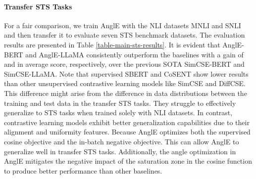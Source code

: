 \documentclass{article} \usepackage{iclr2024_conference,times}
\begin{document}
\paragraph{Transfer STS Tasks} For a fair comparison, we train AnglE with the NLI datasets MNLI \citep{williams-etal-2018-broad} and SNLI \citep{bowman-etal-2015-large} and then transfer it to evaluate seven STS benchmark datasets. The evaluation results are presented in Table \ref{table-main-sts-results}. It is evident that AnglE-BERT and AnglE-LLaMA consistently outperform the baselines with a gain of  and  in average score, respectively, over the previous SOTA SimCSE-BERT and SimCSE-LLaMA. Note that supervised SBERT and CoSENT show lower results than other unsupervised contrastive learning models like SimCSE and DiffCSE. This difference might arise from the difference in data distributions between the training and test data in the transfer STS tasks. They struggle to effectively generalize to STS tasks when trained solely with NLI datasets.
In contrast, contrastive learning models exhibit better generalization capabilities due to their alignment and uniformity features.
Because AnglE optimizes both the supervised cosine objective and the in-batch negative objective. This can allow AnglE to generalize well in transfer STS tasks. Additionally, the angle optimization in AnglE mitigates the negative impact of the saturation zone in the cosine function to produce better performance than other baselines. 
\end{document}
